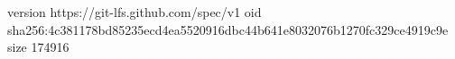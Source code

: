 version https://git-lfs.github.com/spec/v1
oid sha256:4c381178bd85235ecd4ea5520916dbc44b641e8032076b1270fc329ce4919c9e
size 174916
